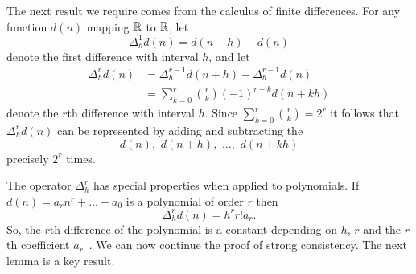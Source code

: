 \documentclass[journal]{IEEEtran}
\begin{document}
The next result we require comes from the calculus of finite differences. For any function $d(n)$ mapping ${\mathbb R}$ to ${\mathbb R}$, let 
\[
\Delta_h^1 d(n) = d(n+h) - d(n)
\] 
denote the first difference with interval $h$, and let
\begin{equation}\label{eq:mthdiffformula}
\begin{split}
\Delta_h^r d(n) &= \Delta_h^{r-1} d(n+h) - \Delta_h^{r-1} d(n) \\
&= \sum_{k=0}^{r}\binom{r}{k}(-1)^{r-k}d(n+kh)
\end{split}
\end{equation}
denote the $r$th difference with interval $h$. Since $\sum_{k=0}^{r}\binom{r}{k} = 2^r$ it follows that $\Delta_h^r d(n)$ can be represented by adding and subtracting the 
\[
d(n), \,\, d(n+h), \,\, \dots, \,\, d(n+kh)
\] 
precisely $2^r$ times.

The operator $\Delta_h^r$ has special properties when applied to polynomials. If $d(n) = a_r n^r + \dots + a_0$ is a polynomial of order $r$ then
 \begin{equation} \label{eq:mfinitediffpoly}
 \Delta_h^r d(n) = h^r r! a_r. 
 \end{equation}
So, the $r$th difference of the polynomial is a constant depending on $h$, $r$ and the $r$th coefficient $a_r$~\cite[page 51]{Jordan_Calculus_of_finite_difference_1965}.  We can now continue the proof of strong consistency.  The next lemma is a key result.
\end{document}
